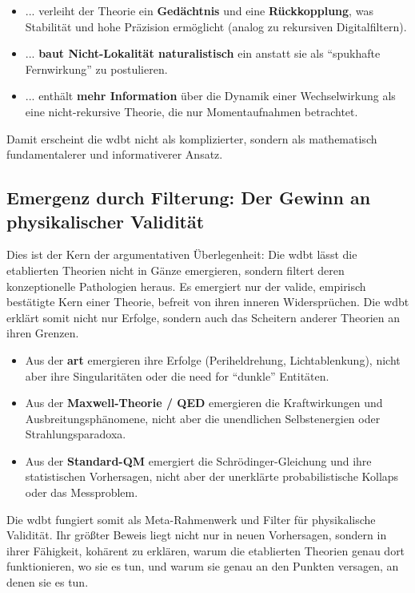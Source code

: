 \begin{itemize}
    \item ... verleiht der Theorie ein \textbf{Gedächtnis} und eine \textbf{Rückkopplung}, was Stabilität und hohe Präzision ermöglicht (analog zu rekursiven Digitalfiltern).
    \item ... \textbf{baut Nicht-Lokalität naturalistisch} ein anstatt sie als \enquote{spukhafte Fernwirkung} zu postulieren.
    \item ... enthält \textbf{mehr Information} über die Dynamik einer Wechselwirkung als eine nicht-rekursive Theorie, die nur Momentaufnahmen betrachtet.
\end{itemize}

Damit erscheint die \gls{wdbt} nicht als komplizierter, sondern als mathematisch fundamentalerer und informativerer Ansatz.

\subsection{Emergenz durch Filterung: Der Gewinn an physikalischer Validität}
Dies ist der Kern der argumentativen Überlegenheit: Die \gls{wdbt} lässt die etablierten Theorien nicht in Gänze emergieren, sondern filtert deren konzeptionelle Pathologien heraus. Es emergiert nur
der valide, empirisch bestätigte Kern einer Theorie, befreit von ihren inneren Widersprüchen. Die \gls{wdbt} erklärt somit nicht nur Erfolge, sondern auch das Scheitern anderer Theorien an ihren Grenzen.

\begin{itemize}
    \item Aus der \textbf{\gls{art}} emergieren ihre Erfolge (Periheldrehung, Lichtablenkung), nicht aber ihre Singularitäten oder die need for \enquote{dunkle} Entitäten.
    \item Aus der \textbf{Maxwell-Theorie / QED} emergieren die Kraftwirkungen und Ausbreitungsphänomene, nicht aber die unendlichen Selbstenergien oder Strahlungsparadoxa.
    \item Aus der \textbf{Standard-QM} emergiert die Schrödinger-Gleichung und ihre statistischen Vorhersagen, nicht aber der unerklärte probabilistische Kollaps oder das Messproblem.
\end{itemize}

Die \gls{wdbt} fungiert somit als Meta-Rahmenwerk und Filter für physikalische Validität. Ihr größter Beweis liegt nicht nur in neuen Vorhersagen, sondern in ihrer Fähigkeit, kohärent zu erklären,
warum die etablierten Theorien genau dort funktionieren, wo sie es tun, und warum sie genau an den Punkten versagen, an denen sie es tun.

